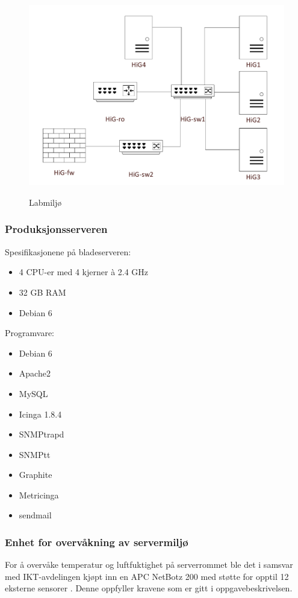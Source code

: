 \begin{figure}[H]
    \centering
    \includegraphics[scale=0.4]{img/labmiljo}
	\label{laboppsett}
    \caption{Labmiljø}
\end{figure}


\subsubsection{Produksjonsserveren}
Spesifikasjonene på bladeserveren:
\begin{itemize}
\item 4 CPU-er med 4 kjerner à 2.4 GHz
\item 32 GB RAM
\item Debian 6
\end{itemize}
Programvare:
\begin{itemize}
\item Debian 6
\item Apache2
\item MySQL
\item Icinga 1.8.4
\item SNMPtrapd
\item SNMPtt
\item Graphite
\item Metricinga 
\item sendmail
\end{itemize}

\subsubsection{Enhet for overvåkning av servermiljø}
For å overvåke temperatur og luftfuktighet på serverrommet ble det i samsvar med IKT-avdelingen kjøpt inn en APC NetBotz 200 med støtte for opptil 12 eksterne sensorer \cite{netbotz}. Denne oppfyller kravene som er gitt i oppgavebeskrivelsen. 

